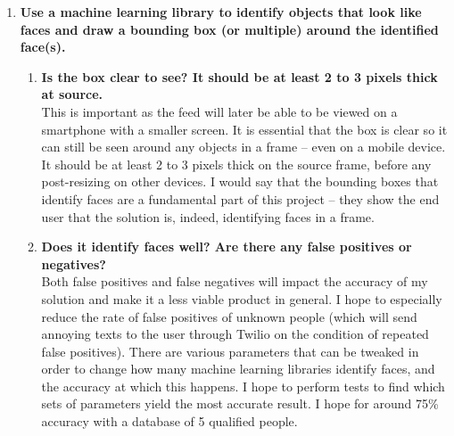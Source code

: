 \documentclass[9pt]{article}
\begin{document}
\begin{small}
\begin{enumerate}
		\item \textbf{Use a machine learning library to identify objects that look like faces and draw a bounding box (or multiple) around the identified face(s).}
		\begin{enumerate}
			\item \textbf{Is the box clear to see? It should be at least 2 to 3 pixels thick at source.} \\
				This is important as the feed will later be able to be viewed on a smartphone with a smaller screen. It is essential that the box is clear so it can still be seen around any objects in a frame – even on a mobile device. It should be at least 2 to 3 pixels thick on the source frame, before any post-resizing on other devices. I would say that the bounding boxes that identify faces are a fundamental part of this project – they show the end user that the solution is, indeed, identifying faces in a frame.
			\item \textbf{Does it identify faces well? Are there any false positives or negatives?} \\
				Both false positives and false negatives will impact the accuracy of my solution and make it a less viable product in general. I hope to especially reduce the rate of false positives of unknown people (which will send annoying texts to the user through Twilio on the condition of repeated false positives). There are various parameters that can be tweaked in order to change how many machine learning libraries identify faces, and the accuracy at which this happens. I hope to perform tests to find which sets of parameters yield the most accurate result. I hope for around 75\% accuracy with a database of 5 qualified people.
		\end{enumerate}
		

\end{enumerate}
\end{small}
\end{document}

